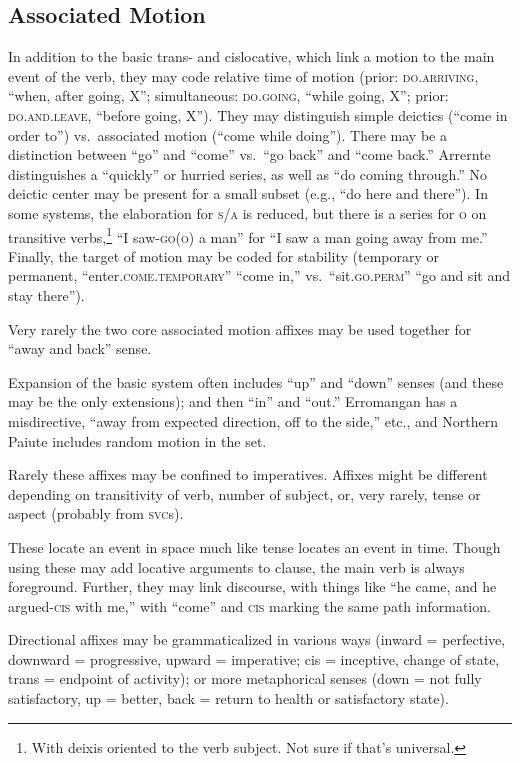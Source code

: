 \documentclass[11pt]{article}
\newcommand{\I}[1]{\textsc{#1}}   %
\begin{document}
{\subsection{Associated Motion}
In addition to the basic trans- and cislocative, which link a motion
to the main event of the verb, they may code relative time of motion
(prior: \I{do.arriving}, ``when, after going, X''; simultaneous:
\I{do.going}, ``while going, X''; prior: \I{do.and.leave}, ``before
going, X''). They may distinguish simple deictics (``come in order
to'') vs.\ associated motion (``come while doing'').  There may be a
distinction between ``go'' and ``come'' vs.\ ``go back'' and ``come
back.''  Arrernte distinguishes a ``quickly'' or hurried series, as
well as ``do coming through.''  No deictic center may be present for a
small subset (e.g., ``do here and there'').  In some systems, the
elaboration for \I{s/a} is reduced, but there is a series for \I{o} on
transitive verbs,\footnote{With deixis oriented to the verb subject.
Not sure if that's universal.} ``I saw-\I{go(o)} a man'' for ``I saw
a man going away from me.''  Finally, the target of motion may be
coded for stability (temporary or permanent,
``enter.\I{come.temporary}'' ``come in,'' vs.\ ``sit.\I{go.perm}''
``go and sit and stay there'').  

Very rarely the two core associated motion affixes may be used
together for ``away and back'' sense.

Expansion of the basic system often includes ``up'' and ``down''
senses (and these may be the only extensions); and then ``in'' and
``out.''  Erromangan has a misdirective, ``away from expected
direction, off to the side,'' etc., and Northern Paiute includes
random motion in the set.

Rarely these affixes may be confined to imperatives.  Affixes might be
different depending on transitivity of verb, number of subject, or,
very rarely, tense or aspect (probably from \I{svc}s).

These locate an event in space much like tense locates an event in
time.  Though using these may add locative arguments to clause, the
main verb is always foreground.  Further, they may link discourse,
with things like ``he came, and he argued-\I{cis} with me,'' with
``come'' and \I{cis} marking the same path information.

Directional affixes may be grammaticalized in various ways (inward =
perfective, downward = progressive, upward = imperative; cis =
inceptive, change of state, trans = endpoint of activity); or more
metaphorical senses (down = not fully satisfactory, up = better, back
= return to health or satisfactory state).

}
\end{document}
